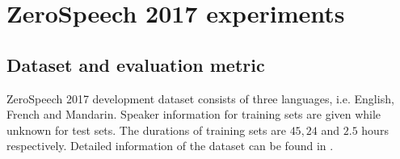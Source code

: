 \documentclass[a4paper]{article}
\begin{document}
\section{ZeroSpeech 2017 experiments}
\label{sec:exp_setup}
\subsection{Dataset and evaluation metric}
ZeroSpeech 2017 development dataset consists of three languages, i.e. English, French and Mandarin. 
Speaker information  for training sets are given while unknown for test sets. The durations of training sets are $45, 24$ and $2.5$ hours respectively.
Detailed information of the dataset can be found in \cite{dunbar2017zero}.
\end{document}

